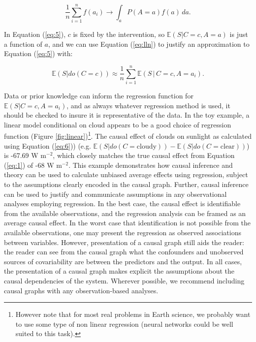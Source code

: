 \documentclass[12pt]{article}
\begin{document}
\begin{equation} \frac{1}{n} \sum_{i=1}^n f(a_i) \to \int_a P(A=a)
  f(a) \, d a.
  \label{eq:lln}
\end{equation}

In Equation (\ref{eq:5}), $c$ is fixed by the intervention, so
$\mathbb{E}(S| C=c, A=a)$ is just a function of $a$, and we can use
Equation (\ref{eq:lln}) to justify an approximation to Equation
(\ref{eq:5}) with:

\begin{equation} \mathbb{E}(S | do(C = c)) \approx \frac{1}{n}
  \sum_{i=1}^n \mathbb{E}(S \, | \, C=c, A=a_i).
  \label{eq:6}
\end{equation}

Data or prior knowledge can inform the regression function for
$\mathbb{E}(S | C=c, A=a_i)$, and as always whatever regression method
is used, it should be checked to insure it is representative of the
data. In the toy example, a linear model conditional on cloud appears
to be a good choice of regression function (Figure
\ref{fig:linear})\footnote{However note that for most real problems in
  Earth science, we probably want to use some type of non linear
  regression (neural networks could be well suited to this
  task).}. The causal effect of clouds on sunlight as calculated using
Equation (\ref{eq:6})) (e.g.
$\mathbb{E}(S | do(C = \text{cloudy})) - \mathbb{E}(S | do(C =
\text{clear}))$) is -67.69 W m$^{-2}$, which closely matches the true
causal effect from Equation (\ref{eq:1}) of -68 W m$^{-2}$. This
example demonstrates how causal inference and theory can be used to
calculate unbiased average effects using regression, subject to the
assumptions clearly encoded in the causal graph. Further, causal
inference can be used to justify and communicate assumptions in any
observational analyses employing regression. In the best case, the
causal effect is identifiable from the available observations, and the
regression analysis can be framed as an average causal effect. In the
worst case that identification is not possible from the available
observations, one may present the regression as observed associations
between variables. However, presentation of a causal graph still aids
the reader: the reader can see from the causal graph what the
confounders and unobserved sources of covariability are between the
predictors and the output. In all cases, the presentation of a causal
graph makes explicit the assumptions about the causal dependencies of
the system. Wherever possible, we recommend including causal graphs
with any observation-based analyses.
\end{document}

